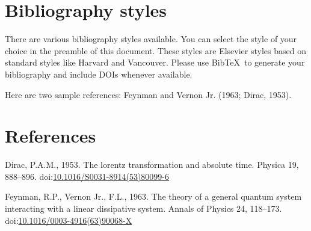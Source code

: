 \documentclass[]{elsarticle} %
\begin{document}
\hypertarget{bibliography-styles}{%
\section{Bibliography styles}\label{bibliography-styles}}

There are various bibliography styles available. You can select the
style of your choice in the preamble of this document. These styles are
Elsevier styles based on standard styles like Harvard and Vancouver.
Please use BibTeX~to generate your bibliography and include DOIs
whenever available.

Here are two sample references: Feynman and Vernon Jr. (1963; Dirac,
1953).

\hypertarget{references}{%
\section*{References}\label{references}}

\hypertarget{refs}{}
\leavevmode\hypertarget{ref-Dirac1953888}{}%
Dirac, P.A.M., 1953. The lorentz transformation and absolute time.
Physica 19, 888--896.
doi:\href{https://doi.org/10.1016/S0031-8914(53)80099-6}{10.1016/S0031-8914(53)80099-6}

\leavevmode\hypertarget{ref-Feynman1963118}{}%
Feynman, R.P., Vernon Jr., F.L., 1963. The theory of a general quantum
system interacting with a linear dissipative system. Annals of Physics
24, 118--173.
doi:\href{https://doi.org/10.1016/0003-4916(63)90068-X}{10.1016/0003-4916(63)90068-X}
\end{document}
